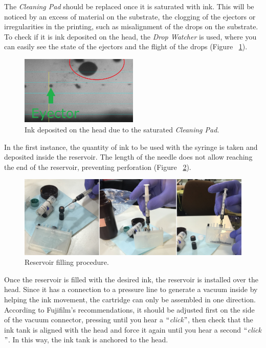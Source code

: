 The \textit{Cleaning Pad} should be replaced once it is saturated with ink. This will be noticed by an excess of material on the substrate, the clogging of the ejectors or irregularities in the printing, such as misalignment of the drops on the substrate. To check if it is ink deposited on the head, the \textit{Drop Watcher} is used, where you can easily see the state of the ejectors and the flight of the drops (Figure ~\ref{fig:Figura_suciedad_cabezal}).

\begin{figure}[H]
  \centering
    \includegraphics[width=0.5\textwidth]{Figures/Figura_suciedad_cabezal}
  \caption{Ink deposited on the head due to the saturated \textit{Cleaning Pad}.}
  \label{fig:Figura_suciedad_cabezal}
\end{figure}

In the first instance, the quantity of ink to be used with the syringe is taken and deposited inside the reservoir. The length of the needle does not allow reaching the end of the reservoir, preventing perforation (Figure ~\ref{fig:Figura_carga_tinta}).

\begin{figure}[H]
  \centering
    \includegraphics[width=1\textwidth]{Figures/Figura_carga_tinta}
  \caption{Reservoir filling procedure.}
  \label{fig:Figura_carga_tinta}
\end{figure}

Once the reservoir is filled with the desired ink, the reservoir is installed over the head. Since it has a connection to a pressure line to generate a vacuum inside by helping the ink movement, the cartridge can only be assembled in one direction. According to Fujifilm's recommendations, it should be adjusted first on the side of the vacuum connector, pressing until you hear a $``$\textit{click}$"$, then check that the ink tank is aligned with the head and force it again until you hear a second $``$\textit{click}$"$. In this way, the ink tank is anchored to the head.

